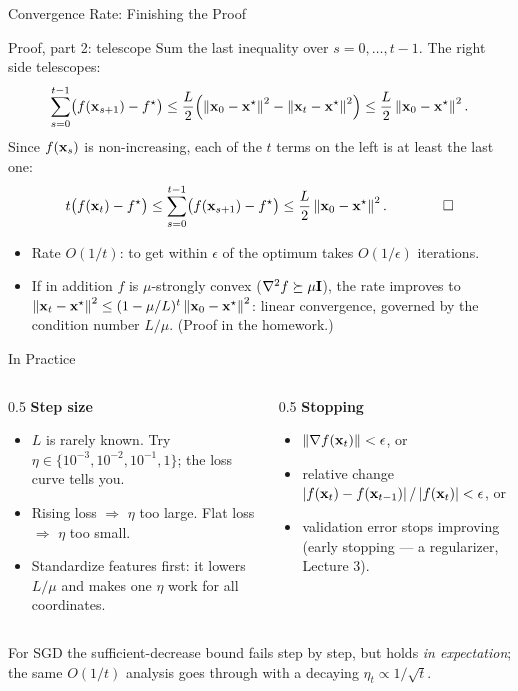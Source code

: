 \documentclass[11pt,aspectratio=169]{beamer}
\begin{document}
\begin{frame}{Convergence Rate: Finishing the Proof}
\begin{derivation}{Proof, part 2: telescope}
Sum the last inequality over $s=0,\dots,t-1$. The right side telescopes:
\[
\sum_{s=0}^{t-1}\bigl(f(\mathbf{x}_{s+1})-f^\star\bigr)
\le\frac L2\Bigl(\left\lVert \mathbf{x}_0-\mathbf{x}^\star \right\rVert^2-\left\lVert \mathbf{x}_t-\mathbf{x}^\star \right\rVert^2\Bigr)
\le\frac L2\left\lVert \mathbf{x}_0-\mathbf{x}^\star \right\rVert^2 .
\]
Since $f(\mathbf{x}_s)$ is non-increasing, each of the $t$ terms on the left is at least the last one:
\[
t\bigl(f(\mathbf{x}_t)-f^\star\bigr)\le\sum_{s=0}^{t-1}\bigl(f(\mathbf{x}_{s+1})-f^\star\bigr)\le\frac L2\left\lVert \mathbf{x}_0-\mathbf{x}^\star \right\rVert^2 .
\qquad\qed
\]
\end{derivation}
\begin{itemize}
  \item Rate $O(1/t)$: to get within $\epsilon$ of the optimum takes $O(1/\epsilon)$ iterations.
  \item If in addition $f$ is $\mu$-strongly convex ($\nabla^2f\succeq\mu\mathbf{I}$), the rate improves to
        $\left\lVert \mathbf{x}_t-\mathbf{x}^\star \right\rVert^2\le(1-\mu/L)^t\left\lVert \mathbf{x}_0-\mathbf{x}^\star \right\rVert^2$: linear convergence, governed by the
        condition number $L/\mu$. (Proof in the homework.)
\end{itemize}
\end{frame}

\begin{frame}{In Practice}
\begin{columns}[T]
\begin{column}{0.5\textwidth}
\textbf{Step size}
\begin{itemize}
  \item $L$ is rarely known. Try $\eta\in\{10^{-3},10^{-2},10^{-1},1\}$; the loss curve tells you.
  \item Rising loss $\Rightarrow$ $\eta$ too large. Flat loss $\Rightarrow$ $\eta$ too small.
  \item Standardize features first: it lowers $L/\mu$ and makes one $\eta$ work for all coordinates.
\end{itemize}
\end{column}
\begin{column}{0.5\textwidth}
\textbf{Stopping}
\begin{itemize}
  \item $\left\lVert \nabla f(\mathbf{x}_t) \right\rVert<\epsilon$, or
  \item relative change $\left\lvert f(\mathbf{x}_t)-f(\mathbf{x}_{t-1}) \right\rvert/\left\lvert f(\mathbf{x}_t) \right\rvert<\epsilon$, or
  \item validation error stops improving (early stopping --- a regularizer, Lecture 3).
\end{itemize}
\end{column}
\end{columns}
\vspace{8pt}
\begin{keypoint}
For SGD the sufficient-decrease bound fails step by step, but holds \emph{in expectation}; the same
$O(1/t)$ analysis goes through with a decaying $\eta_t\propto1/\sqrt t$.
\end{keypoint}
\end{frame}
\end{document}
